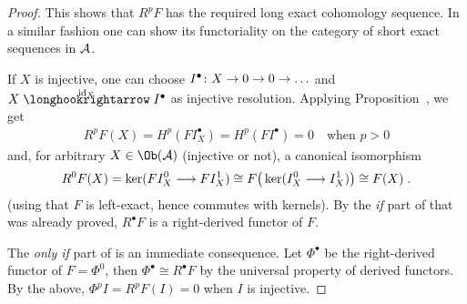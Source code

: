 \documentclass[a4paper,parskip=half,numbers=enddot, DIV=12]{scrreprt}
\begin{document}
\begin{proof}
		This shows that $R^pF$ has the required long exact cohomology sequence. In a similar fashion one can show its functoriality on the category of short exact sequences in $\mathcal{A}$.
		
		If $X$ is injective, one can choose $I^\bullet \colon X\morphism 0\morphism 0\morphism\ldots$ and $X\monomorphism[\id_X]I^\bullet $ as injective resolution. Applying Proposition~, we get 
		\begin{align*}
			R^pF(X)=H^p(FI_X^\bullet )=H^p(FI^\bullet )=0\quad\text{when }p>0
		\end{align*}
		and, for arbitrary $X\in\Ob(\Aa)$ (injective or not), a canonical isomorphism
		\begin{align*}
			R^0F(X)=\ker(FI_X^0\morphism FI_X^1)\cong F\big(\ker(I_X^0\morphism I_X^1)\big)\cong F(X)\;.
		\end{align*}
		(using that $F$ is left-exact, hence commutes with kernels). By the \emph{if} part of  that was already proved, $R^\bullet F$ is a right-derived functor of $F$.
		
		The \emph{only if} part of  is an immediate consequence. Let $\Phi^\bullet $ be the right-derived functor of $F=\Phi^0$, then $\Phi^\bullet \cong R^\bullet F$ by the universal property of derived functors. By the above, $\Phi^pI=R^pF(I)=0$ when $I$ is injective.
		

\end{proof}
\end{document}
